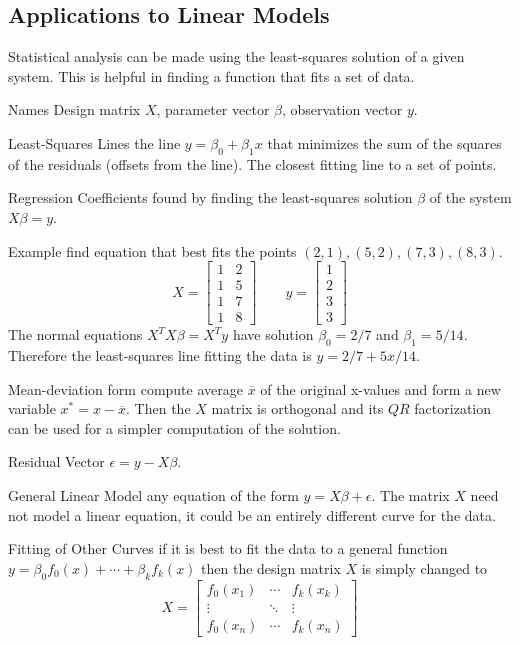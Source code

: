\begin{card}
    \subsection{Applications to Linear Models}

    \begin{compactdesc}
    \item[Statistical analysis] can be made using the least-squares
        solution of a given system. This is helpful in finding a function
        that fits a set of data.
    \item[Names] Design matrix $X$, parameter vector $\beta$, observation vector $y$.
    \item[Least-Squares Lines] the line $y = \beta_0 + \beta_1 x$ that
        minimizes the sum of the squares of the residuals (offsets from the line).
        The closest fitting line to a set of points.
    \item[Regression Coefficients] found by finding the least-squares
        solution $\beta$ of the system $X\beta = y$.
    \item[Example] find equation that best fits the points
        $(2, 1), (5, 2), (7, 3), (8, 3)$.
        $$X = \begin{bmatrix}1&2\\1&5\\1&7\\1&8\end{bmatrix}
        \qquad
        y = \begin{bmatrix}1\\2\\3\\3\end{bmatrix}$$
        The normal equations $X^TX\beta = X^Ty$ have solution
        $\beta_0 = 2/7$ and $\beta_1 = 5/14$.
        Therefore the least-squares line fitting the data is
        $y = 2/7 + 5x/14$.

    \item[Mean-deviation form] compute average $\overline{x}$ of the original x-values
        and form a new variable $x^* = x - \overline{x}$.
        Then the $X$ matrix is orthogonal and its $QR$ factorization can be
        used for a simpler computation of the solution.
    \item[Residual Vector] $\epsilon = y - X\beta$.
    \item[General Linear Model] any equation of the form $y = X\beta + \epsilon$.
        The matrix $X$ need not model a linear equation, it could be an
        entirely different curve for the data.
    \item[Fitting of Other Curves] if it is best to fit the data to a
        general function $y = \beta_0f_0(x) + \dotsb + \beta_kf_k(x)$
        then the design matrix $X$ is simply changed to
        $$X = \begin{bmatrix}f_0(x_1) & \cdots & f_k(x_k)
                          \\ \vdots & \ddots & \vdots
                          \\ f_0(x_n) & \cdots & f_k(x_n) \end{bmatrix}$$


\end{compactdesc}
\end{card}
